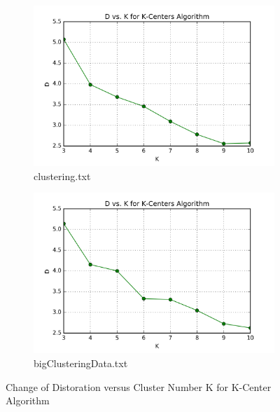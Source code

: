 \begin{description}
\begin{description}
\begin{figure}[H]
\centering
\centering
        \begin{subfigure}[b]{0.49\textwidth}
            \centering
            \includegraphics[width=\textwidth]{./figures/loss_clustering_kCenter.png}
            \caption{clustering.txt}\label{fig:4a}
        \end{subfigure}
        \hfill
        \begin{subfigure}[b]{0.49\textwidth}  
            \centering 
            \includegraphics[width=\textwidth]{./figures/loss_bigClustering_kCenter.png}
            \caption{bigClusteringData.txt}\label{fig:4b}
        \end{subfigure}
\caption{Change of Distoration versus Cluster Number K for K-Center Algorithm}
\label{fig:k-centers-loss} 
\end{figure}


\end{description}
\end{description}
